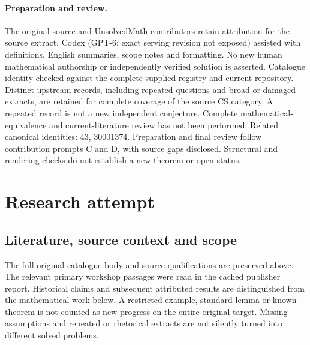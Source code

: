 \documentclass[11pt]{article}
\begin{document}
\paragraph{Preparation and review.}
The original source and UnsolvedMath contributors retain attribution for the source extract. Codex (GPT-6; exact serving revision not exposed) assisted with definitions, English summaries, scope notes and formatting. No new human mathematical authorship or independently verified solution is asserted. Catalogue identity checked against the complete supplied registry and current repository. Distinct upstream records, including repeated questions and broad or damaged extracts, are retained for complete coverage of the source CS category. A repeated record is not a new independent conjecture. Complete mathematical-equivalence and current-literature review has not been performed. Related canonical identities: 43, 30001374. Preparation and final review follow contribution prompts C and D, with source gaps disclosed. Structural and rendering checks do not establish a new theorem or open status.
\label{end:statement}

\section{Research attempt}
\subsection{Literature, source context and scope}
The full original catalogue body and source qualifications are preserved above. The relevant primary workshop passages were read in the cached publisher report. Historical claims and subsequent attributed results are distinguished from the mathematical work below. A restricted example, standard lemma or known theorem is not counted as new progress on the entire original target. Missing assumptions and repeated or rhetorical extracts are not silently turned into different solved problems.
\end{document}
